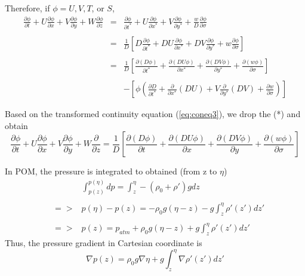 \documentclass[oribibl]{llncs}
\begin{document}
Therefore, if $\phi=U,V,T$, or $S$,
\begin{eqnarray}
\frac{\partial \phi}{\partial t}+U\frac{\partial \phi}{\partial x} + V\frac{\partial \phi}{\partial y}+W\frac{\partial \phi}{\partial z} &=& \frac{\partial \phi}{\partial t^*}+U\frac{\partial \phi}{\partial x^*} + V\frac{\partial \phi}{\partial y^*}+\frac{w}{D}\frac{\partial \phi}{\partial \sigma} \nonumber \\ \nonumber \\ 
&=& \frac{1}{D} \left[  D\frac{\partial \phi}{\partial t^*}+DU\frac{\partial \phi}{\partial x^*} + DV\frac{\partial \phi}{\partial y^*}+w\frac{\partial \phi}{\partial \sigma}  \right]  \nonumber \\ \nonumber \\ 
&=& \frac{1}{D} \left[  \frac{\partial (D\phi)}{\partial t^*}+\frac{\partial (DU\phi)}{\partial x^*} + \frac{\partial (DV\phi)}{\partial y^*}+\frac{\partial (w\phi)}{\partial \sigma}  \right]   \nonumber \\ \nonumber \\ 
&& - \left[ \phi \left( \frac{\partial D}{\partial t^*}+\frac{\partial}{\partial x^*}(DU) + V\frac{\partial }{\partial y^*}(DV)+\frac{\partial w}{\partial \sigma} \right) \right] 
\end{eqnarray}


Based on the transformed continuity equation (\ref{eq:coneq3}), we drop the (*) and obtain
\begin{equation}
\frac{\partial \phi}{\partial t}+U\frac{\partial \phi}{\partial x} + V\frac{\partial \phi}{\partial y}+W\frac{\partial}{\partial z} =  \frac{1}{D} \left[  \frac{\partial (D\phi)}{\partial t}+\frac{\partial (DU\phi)}{\partial x} + \frac{\partial (DV\phi)}{\partial y}+\frac{\partial (w\phi)}{\partial \sigma}  \right] 
\end{equation}

In POM, the pressure is integrated to obtained (from z to  $\eta $)
\begin{eqnarray}
&&\int_{p(z)}^{p(\eta)} dp = \int_z^\eta -(\rho_0 + \rho' )g dz \nonumber \\ \nonumber \\ 
&=>& p(\eta)-p(z) =-\rho_0 g (\eta - z) -g \int_z^\eta \rho'(z') dz' \nonumber \\ \nonumber \\ 
&=>& p(z) = p_{atm}+\rho_0 g (\eta - z) +g \int_z^\eta \rho'(z') dz'
\end{eqnarray}
Thus, the pressure gradient in Cartesian coordinate is 
\begin{equation}\label{eq:p1}
\nabla p(z) = \rho_0 g \nabla \eta  +g\int_z^\eta \nabla \rho'(z') dz'
\end{equation}
\end{document}
